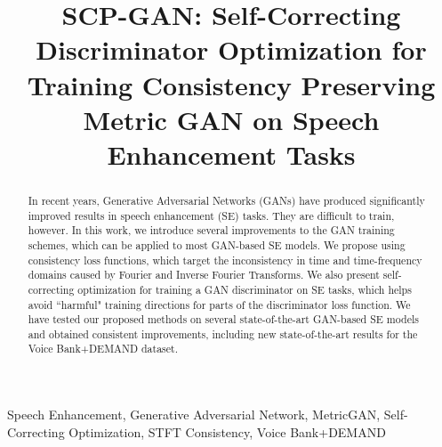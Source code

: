 \documentclass{article}
\title{SCP-GAN: Self-Correcting Discriminator Optimization for Training Consistency Preserving Metric GAN on Speech Enhancement Tasks}
\begin{document}
\maketitle
\begin{abstract}
In recent years, Generative Adversarial Networks (GANs) have produced significantly improved results in speech enhancement (SE) tasks. They are difficult to train, however. In this work, we introduce several improvements to the GAN training schemes, which can be applied to most GAN-based SE models. We propose using consistency loss functions, which target the inconsistency in time and time-frequency domains caused by Fourier and Inverse Fourier Transforms. We also present self-correcting optimization for training a GAN discriminator on SE tasks, which helps avoid ``harmful" training directions for parts of the discriminator loss function. We have tested our proposed methods on several state-of-the-art GAN-based SE models and obtained consistent improvements, including new state-of-the-art results for the Voice Bank+DEMAND dataset.
\end{abstract}
\begin{keywords}
Speech Enhancement, Generative Adversarial Network, MetricGAN, Self-Correcting Optimization, STFT Consistency, Voice Bank+DEMAND
\end{keywords}
\end{document}
